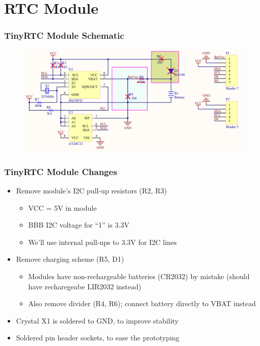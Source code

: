 
\section{RTC Module}

\begin{frame}
  \frametitle{TinyRTC Module Schematic}
  \begin{figure}
    \centering
    \includegraphics[scale=0.15]{images/tinyrtc-scheme-mod.png}
  \end{figure}
  \vspace*{-12mm}
\end{frame}

\begin{frame}
  \frametitle{TinyRTC Module Changes}
  \begin{itemize}
    \item Remove module's I2C pull-up resistors (R2, R3)
    \begin{itemize}
      \item VCC = 5V in module
      \item BBB I2C voltage for ``1'' is 3.3V
      \item \alert{We'll use internal pull-ups to 3.3V for I2C lines}
    \end{itemize}
    \item Remove charging scheme (R5, D1)
    \begin{itemize}
      \item Modules have non-rechargeable batteries (CR2032) by mistake
            (should have recharegeabe LIR2032 instead)
      \item Also remove divider (R4, R6); connect battery directly to VBAT
            instead
    \end{itemize}
    \item Crystal X1 is soldered to GND, to improve stability
    \item Soldered pin header sockets, to ease the prototyping
  \end{itemize}
\end{frame}

